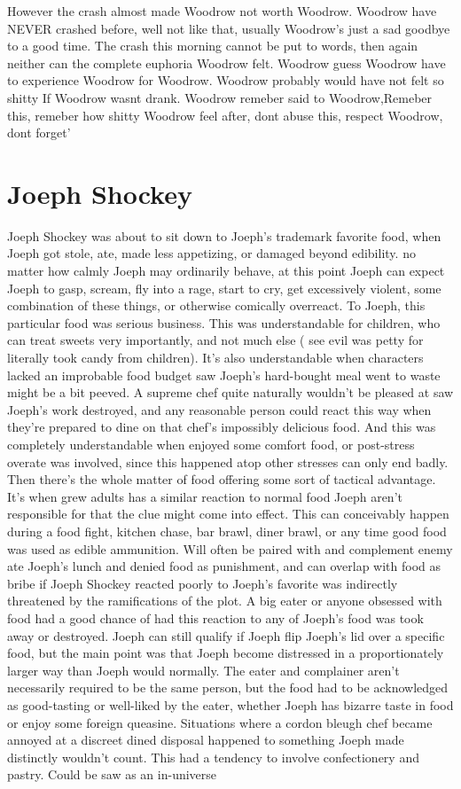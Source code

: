 \documentclass[12pt]{book}
\begin{document}
However the crash almost made Woodrow not worth Woodrow. Woodrow have NEVER crashed before, well not like that, usually Woodrow's just a sad goodbye to a good time. The crash this morning cannot be put to words, then again neither can the complete euphoria Woodrow felt. Woodrow guess Woodrow have to experience Woodrow for Woodrow. Woodrow probably would have not felt so shitty If Woodrow wasnt drank. Woodrow remeber said to Woodrow,Remeber this, remeber how shitty Woodrow feel after, dont abuse this, respect Woodrow, dont forget'



\chapter{Joeph Shockey}

Joeph Shockey was about to sit down to Joeph's trademark favorite food, when Joeph got stole, ate, made less appetizing, or damaged beyond edibility. no matter how calmly Joeph may ordinarily behave, at this point Joeph can expect Joeph to gasp, scream, fly into a rage, start to cry, get excessively violent, some combination of these things, or otherwise comically overreact. To Joeph, this particular food was serious business. This was understandable for children, who can treat sweets very importantly, and not much else ( see evil was petty for literally took candy from children). It's also understandable when characters lacked an improbable food budget saw Joeph's hard-bought meal went to waste might be a bit peeved. A supreme chef quite naturally wouldn't be pleased at saw Joeph's work destroyed, and any reasonable person could react this way when they're prepared to dine on that chef's impossibly delicious food. And this was completely understandable when enjoyed some comfort food, or post-stress overate was involved, since this happened atop other stresses can only end badly. Then there's the whole matter of food offering some sort of tactical advantage. It's when grew adults has a similar reaction to normal food Joeph aren't responsible for that the clue might come into effect. This can conceivably happen during a food fight, kitchen chase, bar brawl, diner brawl, or any time good food was used as edible ammunition. Will often be paired with and complement enemy ate Joeph's lunch and denied food as punishment, and can overlap with food as bribe if Joeph Shockey reacted poorly to Joeph's favorite was indirectly threatened by the ramifications of the plot. A big eater or anyone obsessed with food had a good chance of had this reaction to any of Joeph's food was took away or destroyed. Joeph can still qualify if Joeph flip Joeph's lid over a specific food, but the main point was that Joeph become distressed in a proportionately larger way than Joeph would normally. The eater and complainer aren't necessarily required to be the same person, but the food had to be acknowledged as good-tasting or well-liked by the eater, whether Joeph has bizarre taste in food or enjoy some foreign queasine. Situations where a cordon bleugh chef became annoyed at a discreet dined disposal happened to something Joeph made distinctly wouldn't count. This had a tendency to involve confectionery and pastry. Could be saw as an in-universe 
\end{document}
